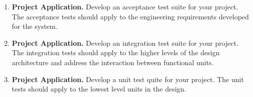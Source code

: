 \begin{enumerate}
\item
  \textbf{Project Application.} Develop an acceptance test suite for
  your project. The acceptance tests should apply to the engineering
  requirements developed for the system.
\item
  \textbf{Project Application.} Develop an integration test suite for
  your project. The integration tests should apply to the higher levels
  of the design architecture and address the interaction between
  functional units.
\item
  \textbf{Project Application.} Develop a unit test quite for your
  project. The unit tests should apply to the lowest level units in the
  design.
\end{enumerate}
